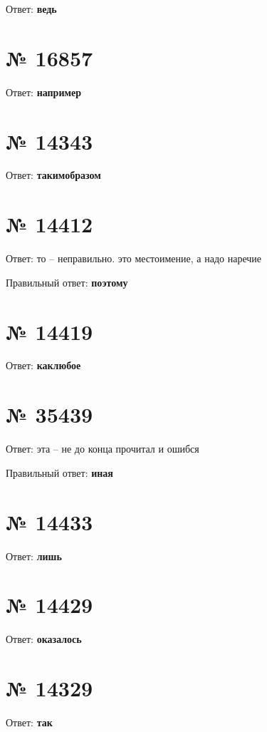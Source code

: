 \documentclass[11pt]{article} %
\begin{document}
Ответ: \textbf{ведь}

\section{№ \textbf{16857}}

Ответ: \textbf{например}

\section{№ \textbf{14343}}

Ответ: \textbf{такимобразом}

\section{№ \textbf{14412}}

Ответ: то -- неправильно. это местоимение, а надо наречие

Правильный ответ: \textbf{поэтому}

\section{№ \textbf{14419}}

Ответ: \textbf{каклюбое}

\section{№ \textbf{35439}}

Ответ: эта -- не до конца прочитал и ошибся

Правильный ответ: \textbf{иная}

\section{№ \textbf{14433}}

Ответ: \textbf{лишь}

\section{№ \textbf{14429}}

Ответ: \textbf{оказалось}

\section{№ \textbf{14329}}

Ответ: \textbf{так}
\end{document}
